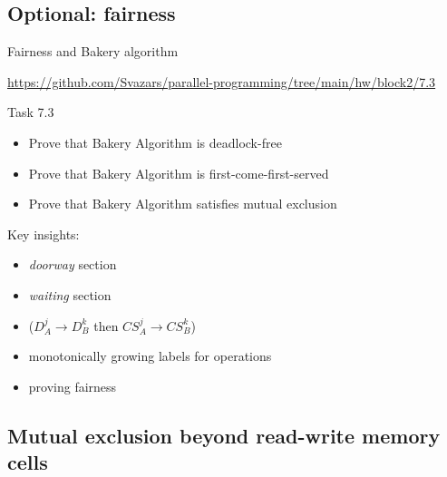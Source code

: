 \subsection{Optional: fairness}
\showTOCSub

\begin{frame}[fragile]{Fairness and Bakery algorithm}

{\small\url{https://github.com/Svazars/parallel-programming/tree/main/hw/block2/7.3}}
\begin{homeworkmail}{Task 7.3}
    \begin{itemize}
      \item Prove that Bakery Algorithm is deadlock-free
      \item Prove that Bakery Algorithm is first-come-first-served
      \item Prove that Bakery Algorithm satisfies mutual exclusion
    \end{itemize}
\end{homeworkmail}

Key insights: 
\begin{itemize}
  \item \textit{doorway} section
  \item \textit{waiting} section
  \item {} ($D_{A}^{j} \rightarrow D_{B}^{k}$ then $CS_{A}^{j} \rightarrow CS_{B}^{k}$)
  \item monotonically growing labels for operations
  \item proving fairness
\end{itemize}


\end{frame}


\subsection{Mutual exclusion beyond read-write memory cells}
\showTOCSub


